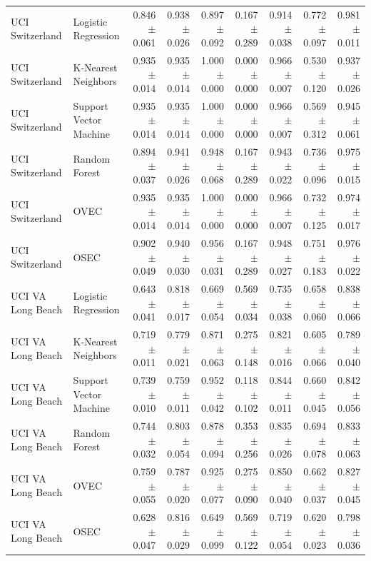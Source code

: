 \begin{tabular}{llrrrrrrr}
UCI Switzerland & Logistic Regression & 0.846 $\pm$ 0.061 & 0.938 $\pm$ 0.026 & 0.897 $\pm$ 0.092 & 0.167 $\pm$ 0.289 & 0.914 $\pm$ 0.038 & 0.772 $\pm$ 0.097 & 0.981 $\pm$ 0.011 \\
UCI Switzerland & K-Nearest Neighbors & 0.935 $\pm$ 0.014 & 0.935 $\pm$ 0.014 & 1.000 $\pm$ 0.000 & 0.000 $\pm$ 0.000 & 0.966 $\pm$ 0.007 & 0.530 $\pm$ 0.120 & 0.937 $\pm$ 0.026 \\
UCI Switzerland & Support Vector Machine & 0.935 $\pm$ 0.014 & 0.935 $\pm$ 0.014 & 1.000 $\pm$ 0.000 & 0.000 $\pm$ 0.000 & 0.966 $\pm$ 0.007 & 0.569 $\pm$ 0.312 & 0.945 $\pm$ 0.061 \\
UCI Switzerland & Random Forest & 0.894 $\pm$ 0.037 & 0.941 $\pm$ 0.026 & 0.948 $\pm$ 0.068 & 0.167 $\pm$ 0.289 & 0.943 $\pm$ 0.022 & 0.736 $\pm$ 0.096 & 0.975 $\pm$ 0.015 \\
UCI Switzerland & OVEC & 0.935 $\pm$ 0.014 & 0.935 $\pm$ 0.014 & 1.000 $\pm$ 0.000 & 0.000 $\pm$ 0.000 & 0.966 $\pm$ 0.007 & 0.732 $\pm$ 0.125 & 0.974 $\pm$ 0.017 \\
UCI Switzerland & OSEC & 0.902 $\pm$ 0.049 & 0.940 $\pm$ 0.030 & 0.956 $\pm$ 0.031 & 0.167 $\pm$ 0.289 & 0.948 $\pm$ 0.027 & 0.751 $\pm$ 0.183 & 0.976 $\pm$ 0.022 \\
UCI VA Long Beach & Logistic Regression & 0.643 $\pm$ 0.041 & 0.818 $\pm$ 0.017 & 0.669 $\pm$ 0.054 & 0.569 $\pm$ 0.034 & 0.735 $\pm$ 0.038 & 0.658 $\pm$ 0.060 & 0.838 $\pm$ 0.066 \\
UCI VA Long Beach & K-Nearest Neighbors & 0.719 $\pm$ 0.011 & 0.779 $\pm$ 0.021 & 0.871 $\pm$ 0.063 & 0.275 $\pm$ 0.148 & 0.821 $\pm$ 0.016 & 0.605 $\pm$ 0.066 & 0.789 $\pm$ 0.040 \\
UCI VA Long Beach & Support Vector Machine & 0.739 $\pm$ 0.010 & 0.759 $\pm$ 0.011 & 0.952 $\pm$ 0.042 & 0.118 $\pm$ 0.102 & 0.844 $\pm$ 0.011 & 0.660 $\pm$ 0.045 & 0.842 $\pm$ 0.056 \\
UCI VA Long Beach & Random Forest & 0.744 $\pm$ 0.032 & 0.803 $\pm$ 0.054 & 0.878 $\pm$ 0.094 & 0.353 $\pm$ 0.256 & 0.835 $\pm$ 0.026 & 0.694 $\pm$ 0.078 & 0.833 $\pm$ 0.063 \\
UCI VA Long Beach & OVEC & 0.759 $\pm$ 0.055 & 0.787 $\pm$ 0.020 & 0.925 $\pm$ 0.077 & 0.275 $\pm$ 0.090 & 0.850 $\pm$ 0.040 & 0.662 $\pm$ 0.037 & 0.827 $\pm$ 0.045 \\
UCI VA Long Beach & OSEC & 0.628 $\pm$ 0.047 & 0.816 $\pm$ 0.029 & 0.649 $\pm$ 0.099 & 0.569 $\pm$ 0.122 & 0.719 $\pm$ 0.054 & 0.620 $\pm$ 0.023 & 0.798 $\pm$ 0.036 \\
\bottomrule
\end{tabular}
